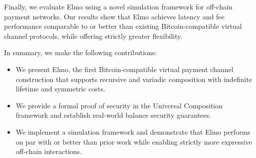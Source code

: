   Finally, we evaluate Elmo using a novel simulation framework for
  off-chain payment networks. Our results show that Elmo achieves latency and
  fee performance comparable to or better than existing Bitcoin-compatible
  virtual channel protocols, while offering strictly greater flexibility.

In summary, we make the following contributions:
\begin{itemize}
\item We present Elmo,
the first Bitcoin-compatible virtual payment channel construction that supports
recursive and variadic composition with indefinite lifetime and symmetric costs.
\item We provide a formal proof of security in the Universal Composition
framework and establish real-world balance security guarantees.
\item We implement a simulation framework and demonstrate that Elmo performs on
par with or better than prior work while enabling strictly more expressive
off-chain interactions.
\end{itemize}
